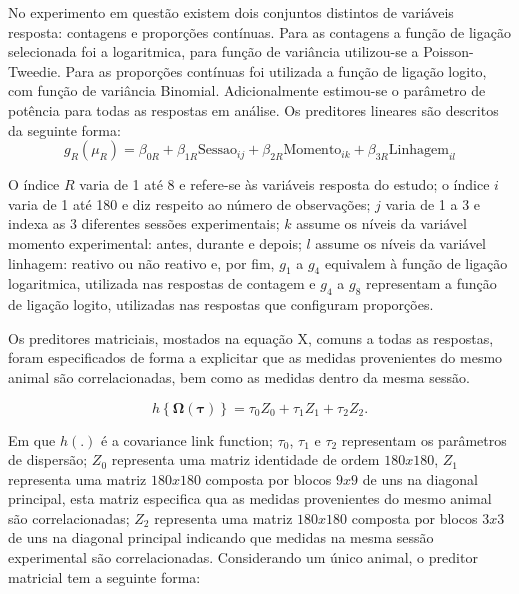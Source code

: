 No experimento em questão existem dois conjuntos distintos de variáveis 
resposta: contagens e proporções contínuas. Para as contagens a função
de ligação selecionada foi a logaritmica, para função de variância 
utilizou-se a Poisson-Tweedie. Para as proporções contínuas foi
utilizada a função de ligação logito, com função de variância Binomial. 
Adicionalmente estimou-se o parâmetro de potência para todas as
respostas em análise. Os preditores lineares são descritos da seguinte 
forma:
\begin{equation}
g_{R}(\mu_{R}) = \beta_{0R} + \beta_{1R}\text{Sessao}_{ij} + \beta_{2R}\text{Momento}_{ik} + \beta_{3R}\text{Linhagem}_{il}
\end{equation}

O índice $R$ varia de 1 até 8 e refere-se às variáveis resposta do estudo; o índice $i$ varia de 1 até 180 e diz respeito ao número de observações; $j$ varia de 1 a 3 e indexa as 3 diferentes sessões experimentais; $k$ assume os níveis da variável momento experimental: antes, durante e depois; $l$ assume os níveis da variável linhagem: reativo ou não reativo e, por fim, $g_{1}$ a $g_{4}$ equivalem à função de ligação logaritmica, utilizada nas respostas de contagem e $g_{4}$ a $g_{8}$ representam a função de ligação logito, utilizadas nas respostas que configuram proporções.

Os preditores matriciais, mostados na equação X, comuns a todas as respostas, foram especificados de forma a explicitar que as medidas provenientes do mesmo animal são correlacionadas, bem como as medidas dentro da mesma sessão. 

\begin{equation}
h\left \{ \boldsymbol{\Omega}(\boldsymbol{\tau}) \right \} = \tau_0Z_0 + \tau_1Z_1 + \tau_2Z_2.
\end{equation}

Em que $h(.)$ é a covariance link function; $\tau_0$, $\tau_1$ e $\tau_2$ representam os parâmetros de dispersão; $Z_0$ representa uma matriz identidade de ordem $180 x 180$, $Z_1$ representa uma matriz $180 x 180$ composta por blocos $9 x 9$ de uns na diagonal principal, esta matriz especifica qua as medidas provenientes do mesmo animal são correlacionadas; $Z_2$ representa uma matriz $180 x 180$ composta por blocos $3 x 3$ de uns na diagonal principal indicando que medidas na mesma sessão experimental são correlacionadas. Considerando um único animal, o preditor matricial tem a seguinte forma:

